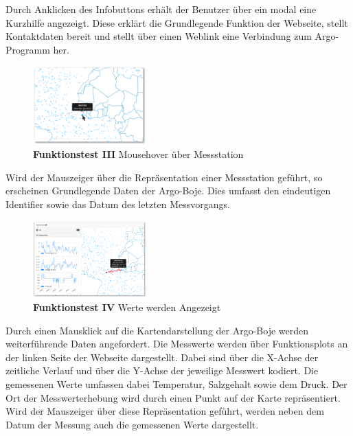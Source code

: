 Durch Anklicken des Infobuttons erhält der Benutzer über ein modal eine Kurzhilfe angezeigt. Diese erklärt die Grundlegende Funktion der Webseite, stellt Kontaktdaten bereit und stellt über einen Weblink eine Verbindung zum Argo-Programm her.
\newline\newline\newline\newline


\begin{figure}
 \centering
 \includegraphics[width=0.39\textwidth]{pix/ftest/002.png}

 \caption{\textbf{Funktionstest III} Mousehover über Messstation}
 \label{fig:ftest002}
\end{figure} 

Wird der Mauszeiger über die Repräsentation einer Messstation geführt, so erscheinen Grundlegende Daten der Argo-Boje. Dies umfasst den eindeutigen Identifier sowie das Datum des letzten Messvorgangs. 
\newline\newline\newline\newline\newline


\begin{figure}
 \centering
 \includegraphics[width=0.39\textwidth]{pix/ftest/003.png}

 \caption{\textbf{Funktionstest IV} Werte werden Angezeigt}
 \label{fig:ftest003}
\end{figure}

Durch einen Mausklick auf die Kartendarstellung der Argo-Boje werden weiterführende Daten angefordert. Die Messwerte werden über Funktionsplots an der linken Seite der Webseite dargestellt. Dabei sind über die X-Achse der zeitliche Verlauf und über die Y-Achse der jeweilige Messwert kodiert. Die gemessenen Werte umfassen dabei Temperatur, Salzgehalt sowie dem Druck.  Der Ort der Messwerterhebung wird durch einen Punkt auf der Karte repräsentiert. Wird der Mauszeiger über diese Repräsentation geführt, werden neben dem Datum der Messung auch die gemessenen Werte dargestellt.


